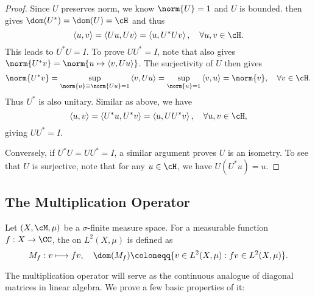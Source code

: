 \documentclass[oneside,reqno,letterpaper]{amsart}
\begin{document}
\begin{proof}
  Since \(U\) preserves norm, we know \(\norm{U} = 1\) and \(U\) is bounded.
   then gives \(\dom(U^*) = \dom(U) = \cH\) and thus 
  \[
    \left< u, v \right> = \left< Uu, Uv \right> = \left< u, U^*Uv \right>, \quad \forall u, v \in \cH . 
  \] 
  This leads to \(U^* U = I\).
  To prove \(UU^* = I\), note that  also gives \(\norm{U^* v} = \norm{u \mapsto \left< v, U u \right>}\). 
  The surjectivity of \(U\) then gives 
  \[
    \norm{U^* v} 
    = \sup_{\norm{u} \equiv \norm{U u} = 1} \left< v, U u \right> 
    = \sup_{\norm{u} = 1} \left< v, u \right>
    = \norm{v} , 
    \quad \forall v \in \cH . 
  \]
  Thus \(U^*\) is also unitary. 
  Similar as above, we have
  \[
    \left< u, v \right> = \left< U^* u, U^* v \right> = \left< u, U U^* v \right>, \quad \forall u, v \in \cH , 
  \] 
  giving \(U U^* = I\). 

  Conversely, if \(U^* U = UU^* = I\), a similar argument proves \(U\) is an isometry. 
  To see that \(U\) is surjective, note that for any \(u \in \cH\), we have \(U(U^* u) = u\). 
\end{proof}



\subsection{The Multiplication Operator}
\begin{definition}
\label{def:multiplication-operator}
  Let \((X, \cM, \mu)\) be a \(\sigma\)-finite measure space. For a measurable function \(f: X \to \CC\), the  on \(L^2(X, \mu)\) is defined as 
  \[
    M_f: v \longmapsto f v, \quad \dom(M_f) \coloneqq \{ v \in L^2(X, \mu): f v \in L^2(X, \mu)\} . 
  \] 
\end{definition}

The multiplication operator will serve as the continuous analogue of diagonal matrices in linear algebra. 
We prove a few basic properties of it:
\end{document}
